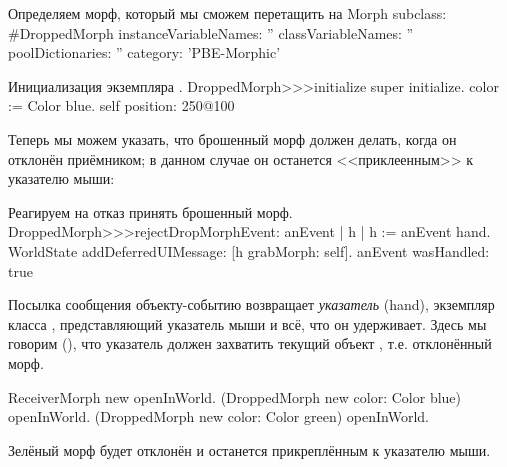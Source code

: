 \documentclass[a4paper,10pt,twoside]{book}
\begin{document}
\begin{classdef}{Определяем морф, который мы сможем перетащить на }
Morph subclass: #DroppedMorph
	instanceVariableNames: ''
	classVariableNames: ''
	poolDictionaries: ''
	category: 'PBE-Morphic'
\end{classdef}

\begin{method}{Инициализация экземпляра .}
DroppedMorph>>>initialize
	super initialize.
	color := Color blue.
	self position: 250@100
\end{method}

Теперь мы можем указать, что брошенный морф должен делать, когда он отклонён приёмником; в данном случае он останется <<приклеенным>> к указателю мыши:
\begin{method}{Реагируем на отказ принять брошенный морф.}
DroppedMorph>>>rejectDropMorphEvent: anEvent
	| h |
	h := anEvent hand.
	WorldState
		addDeferredUIMessage: [h grabMorph: self].
	anEvent wasHandled: true
\end{method}

Посылка сообщения  объекту-событию возвращает \emph{указатель} (hand), экземпляр класса , представляющий указатель мыши и всё, что он удерживает.
Здесь мы говорим  (), что указатель должен захватить текущий объект , т.е. отклонённый морф.

\begin{code}{}
ReceiverMorph new openInWorld.
(DroppedMorph new color: Color blue) openInWorld.
(DroppedMorph new color: Color green) openInWorld.
\end{code}
\noindent
Зелёный морф будет отклонён и останется прикреплённым к указателю мыши.
\end{document}
